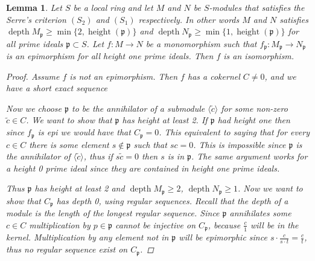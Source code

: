\documentclass[11pt, a4paper, english]{article}
\newtheorem{lemma}[theorem]{Lemma}
\theoremstyle{definition}
\DeclareMathOperator{\depth}{depth}
\DeclareMathOperator{\height}{height}
\begin{document}
\begin{lemma}
\label{lem:height_one_iso}
Let $S$ be a local ring and let $M$ and $N$ be $S$-modules that satisfies the Serre's criterion $(S_2)$ and $(S_1)$ respectively. In other words $M$ and $N$ satisfies $\depth M_\mathfrak{p} \geq \min \{ 2, \height(\mathfrak{p}) \}$ and $\depth N_\mathfrak{p} \geq \min \{ 1, \height(\mathfrak{p}) \}$ for all prime ideals $\mathfrak{p} \subset S$. Let $f: M \to N$ be a monomorphism such that $f_\mathfrak{p}: M_\mathfrak{p} \to N_\mathfrak{p}$ is an epimorphism for all height one prime ideals. Then $f$ is an isomorphism.
\begin{proof}
Assume $f$ is not an epimorphism. Then $f$ has a cokernel $C \neq 0$, and we have a short exact sequence
\begin{center}
\end{center}
Now we choose $\mathfrak{p}$ to be the annihilator of a submodule $\langle \tilde{c} \rangle$ for some non-zero $\tilde{c} \in C$. We want to show that $\mathfrak{p}$ has height at least 2. If $\mathfrak{p}$ had height one then since $f_\mathfrak{p}$ is epi we would have that $C_\mathfrak{p} = 0$. This equivalent to saying that for every $c \in C$ there is some element $s \not\in \mathfrak{p}$ such that $sc = 0$. This is impossible since $\mathfrak{p}$ is the annihilator of $\langle \tilde{c} \rangle$, thus if $s\tilde{c}=0$ then $s$ is in $\mathfrak{p}$. The same argument works for a height 0 prime ideal since they are contained in height one prime ideals.

Thus $\mathfrak{p}$ has height at least 2 and $\depth M_\mathfrak{p} \geq 2$, $\depth N_\mathfrak{p} \geq 1$. Now we want to show that $C_\mathfrak{p}$ has depth 0, using regular sequences. Recall that the depth of a module is the length of the longest regular sequence. Since $\mathfrak{p}$ annihilates some $c \in C$ multiplication by $p \in \mathfrak{p}$ cannot be injective on $C_\mathfrak{p}$, because $\frac{c}{1}$ will be in the kernel. Multiplication by any element not in $\mathfrak{p}$ will be epimorphic since $s \cdot \frac{c}{s \cdot t} = \frac{c}{t}$, thus no regular sequence exist on $C_\mathfrak{p}$.


\end{proof}
\end{lemma}
\end{document}
